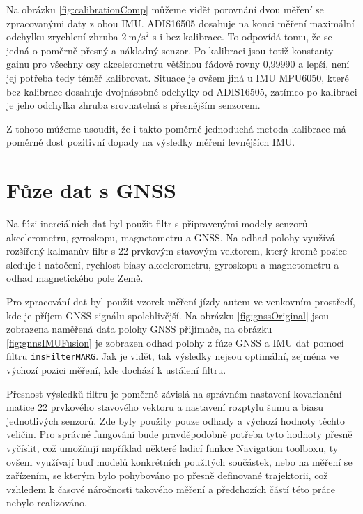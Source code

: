 Na obrázku \ref{fig:calibrationComp} můžeme vidět porovnání dvou měření se zpracovanými daty z obou IMU. ADIS16505 dosahuje na konci měření maximální odchylku zrychlení zhruba $ \SI[per-mode = symbol]{2}{\metre\per\second\squared} $ s i bez kalibrace. To odpovídá tomu, že se jedná o poměrně přesný a nákladný senzor. Po kalibraci jsou totiž konstanty gainu pro všechny osy akcelerometru většinou řádově rovny 0,99990 a lepší, není jej potřeba tedy téměř kalibrovat. Situace je ovšem jiná u IMU MPU6050, které bez kalibrace dosahuje dvojnásobné odchylky od ADIS16505, zatímco po kalibraci je jeho odchylka zhruba srovnatelná s přesnějším senzorem.

Z tohoto můžeme usoudit, že i takto poměrně jednoduchá metoda kalibrace má poměrně dost pozitivní dopady na výsledky měření levnějších IMU.

\section{Fůze dat s GNSS}
Na fúzi inerciálních dat byl použit filtr s připravenými modely senzorů akcelerometru, gyroskopu, magnetometru a GNSS. Na odhad polohy využívá rozšířený kalmanův filtr s 22 prvkovým stavovým vektorem, který kromě pozice sleduje i natočení, rychlost biasy akcelerometru, gyroskopu a magnetometru a odhad magnetického pole Země. \cite{M7nvHLyk8N0V3ub2}

Pro zpracování dat byl použit vzorek měření jízdy autem ve venkovním prostředí, kde je  příjem GNSS signálu spolehlivější. Na obrázku \ref{fig:gnssOriginal} jsou zobrazena naměřená data polohy GNSS přijímače, na obrázku \ref{fig:gnnsIMUFusion} je zobrazen odhad polohy z fúze GNSS a IMU dat pomocí filtru \texttt{insFilterMARG}. Jak je vidět, tak výsledky nejsou optimální, zejména ve výchozí pozici měření, kde dochází k ustálení filtru.

Přesnost výsledků filtru je poměrně závislá na správném nastavení kovarianční matice 22 prvkového stavového vektoru a nastavení rozptylu šumu a biasu jednotlivých senzorů. Zde byly použity pouze odhady a výchozí hodnoty těchto veličin. Pro správné fungování bude pravděpodobně potřeba tyto hodnoty přesně vyčíslit, což umožňují například některé ladicí funkce Navigation toolboxu, ty ovšem využívají buď modelů konkrétních použitých součástek, nebo na měření se zařízením, se kterým bylo pohybováno po přesně definované trajektorii, což vzhledem k časové náročnosti takového měření a předchozích částí této práce nebylo realizováno.  

